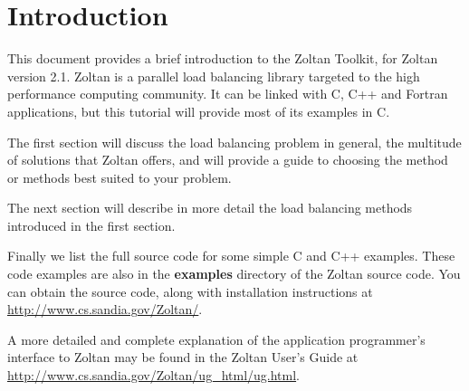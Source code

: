 %
% 
%
\chapter{Introduction}

This document provides a brief introduction to the Zoltan Toolkit,
for Zoltan version 2.1.  Zoltan is a parallel load balancing library
targeted to the high performance computing community.  It can be
linked with C, C++ and Fortran applications, but this tutorial
will provide most of its examples in C.

The first section will discuss the load balancing problem in general,
the multitude of solutions that Zoltan offers, and will provide a guide
to choosing the method or methods best suited to your problem.

The next section will describe in more detail the load balancing
methods introduced in the first section. 

Finally we list the full source code for some simple C and C++
examples.   These code examples are also in the \textbf{examples} directory
of the Zoltan source code.  You can obtain the source code,
along with installation instructions at
\url{http://www.cs.sandia.gov/Zoltan/}.

A more detailed and complete explanation of the application
programmer's interface to Zoltan may be found 
in the Zoltan User's Guide at
\url{http://www.cs.sandia.gov/Zoltan/ug_html/ug.html}.

